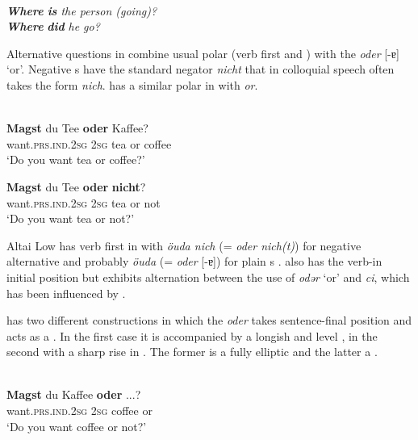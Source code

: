 \ea%
    \label{ex:indo:10}
    \\
    \ea
    \textit{\textbf{{Where}} \textbf{{is}} the person (going)?}\\
    
    \ex
    \textbf{\textit{Where}} \textbf{\textit{did}} \textit{he go?}\\
    \z
    \z 

Alternative questions in  combine usual polar  (verb first  and ) with the  \textit{oder} [-ɐ] ‘or’. Negative s have the standard negator \textit{nicht} that in colloquial speech often takes the form \textit{nich}.  has a similar polar  in  with \textit{or}.

\ea%
    \label{ex:indo:11}
    \\
    \ea
    \gll \textbf{{Magst}} du  Tee \textbf{{oder}} Kaffee?\\
    want.\textsc{prs}.\textsc{ind}.2\textsc{sg}  2\textsc{sg}  tea  or  coffee\\
    \glt ‘Do you want tea or coffee?’
    
    \ex
    \gll \textbf{{Magst}} du  Tee \textbf{{oder}} \textbf{{nicht}}?\\
    want.\textsc{prs}.\textsc{ind}.2\textsc{sg}  2\textsc{sg}  tea  or  not\\
    \glt ‘Do you want tea or not?’
    \z
    \z

\noindent Altai Low  has verb first  in  with \textit{öuda nich} (=  \textit{oder nich(t)}) for negative alternative  and probably \textit{öuda} (=  \textit{oder} [-ɐ]) for plain s \citep[177]{Nieuweboer1999}.  also has the verb-in initial position but exhibits alternation between the use of \textit{odər} ‘or’ and \textit{ci}, which has been influenced by  \citep[205]{Jacobs2005}.

 has two different constructions in which the  \textit{oder} takes sentence-final position and acts as a . In the first case it is accompanied by a longish and level , in the second with a sharp rise in . The former is a fully elliptic  and the latter a .

\ea%
    \label{ex:indo:12}
    \\
    \ea
    \gll \textbf{{Magst}} du  Kaffee \textbf{{oder} }...?\\
    want.\textsc{prs}.\textsc{ind}.2\textsc{sg}  2\textsc{sg}  coffee  or\\
    \glt ‘Do you want coffee or not?’
    
